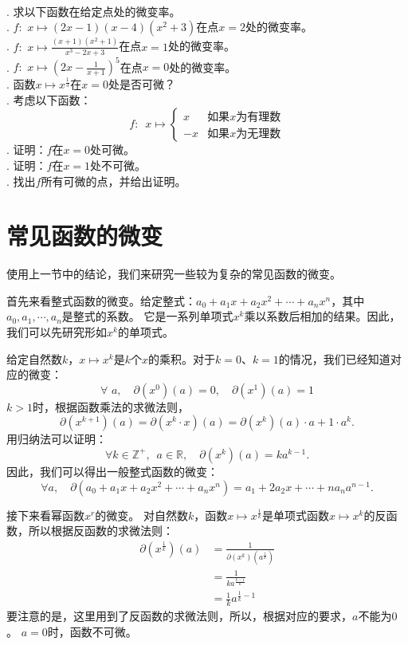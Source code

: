 \documentclass[12pt,UTF8,fontset=none]{ctexbook}
\begin{document}
\begin{xt}
    \mbox{} \\
    . 求以下函数在给定点处的微变率。\\
    . $f: \,\, x \mapsto (2x - 1)(x -4)(x^2 + 3)$在点$x = 2$处的微变率。\\
    . $f: \,\, x \mapsto \frac{(x + 1)(x^2 + 1)}{x^3 - 2x + 3}$在点$x = 1$处的微变率。\\
    . $f: \,\, x \mapsto (2x - \frac{1}{x + 1})^5$在点$x = 0$处的微变率。\\
    . 函数$x \mapsto x^{\frac{1}{3}}$在$x = 0$处是否可微？\\
    . 考虑以下函数：
    $$ f: \,\,\, x\mapsto \left\{
        \begin{array}{cl}
            x & \mbox{如果}x\mbox{为有理数} \\
            -x & \mbox{如果}x\mbox{为无理数} 
        \end{array}\right.
    $$
    . 证明：$f$在$x = 0$处可微。\\
    . 证明：$f$在$x = 1$处不可微。\\
    . 找出$f$所有可微的点，并给出证明。
\end{xt}

\section{常见函数的微变}

使用上一节中的结论，我们来研究一些较为复杂的常见函数的微变。

首先来看整式函数的微变。给定整式：$a_0 + a_1 x + a_2 x^2 + \cdots + a_n x^n$，其中$a_0, a_1, \cdots , a_n$是整式的系数。
它是一系列单项式$x^k$乘以系数后相加的结果。因此，我们可以先研究形如$x^k$的单项式。

给定自然数$k$，$x\mapsto x^k$是$k$个$x$的乘积。对于$k=0$、$k=1$的情况，我们已经知道对应的微变：
$$ \forall \,\, a, \quad \partial (x^0) (a) = 0, \quad \partial (x^1) (a) = 1 $$
$k > 1$时，根据函数乘法的求微法则，
$$ \partial (x^{k+1}) (a) = \partial (x^{k} \cdot x) (a) = \partial (x^k) (a) \cdot a + 1 \cdot a^k. $$
用归纳法可以证明：
$$ \forall k \in \mathbb{Z}^+, \,\,\, a\in \mathbb{R}, \quad \partial (x^k) (a) = k a^{k-1}. $$
因此，我们可以得出一般整式函数的微变：
$$ \forall a, \quad \partial (a_0 + a_1 x + a_2 x^2 + \cdots + a_n x^n) = a_1 + 2 a_2 x + \cdots + n a_n a^{n-1}. $$

接下来看幂函数$x^r$的微变。
对自然数$k$，函数$x \mapsto x^{\frac{1}{k}}$是单项式函数$x\mapsto x^k$的反函数，所以根据反函数的求微法则：
\begin{align*}
    \partial (x^{\frac{1}{k}}) (a) &= \frac{1}{\partial (x^k) (a^{\frac{1}{k}})}  \\
    &= \frac{1}{k a^{\frac{k-1}{k}}}  \\
    &= \frac{1}{k} a^{\frac{1}{k} - 1} 
\end{align*}
要注意的是，这里用到了反函数的求微法则，所以，根据对应的要求，$a$不能为$0$。
$a = 0$时，函数不可微。
\end{document}
